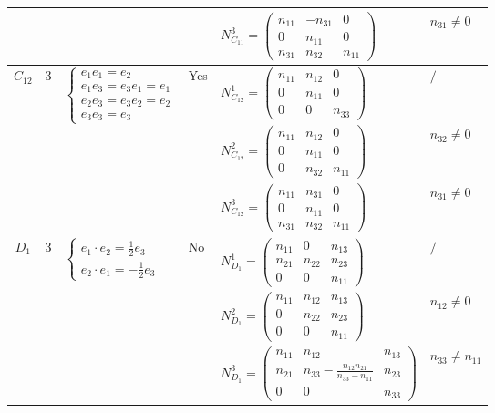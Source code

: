 \documentclass[12pt, reqno]{amsart}
\theoremstyle{plain}
\begin{document}
\begin{table}[H]
\begin{tabular}{|c|c|l|l|l|l|}
    & & & & $N_{C_{11}}^3 = \begin{pmatrix} n_{11} & -n_{31} & 0 \\ 0 & n_{11} & 0 \\ n_{31} & n_{32} & n_{11} \end{pmatrix}$ & $n_{31}\neq0$ \\
    \hline
    \multirow{3}{*}{$C_{12}$} & \multirow{3}{*}{3} & \multirow{3}{*}{$\begin{cases} e_1 e_1 = e_2 \\ e_1 e_3 = e_3 e_1 = e_1 \\ e_2 e_3 = e_3 e_2 = e_2 \\ e_3 e_3 = e_3 \end{cases}$} & \multirow{3}{*}{Yes} & 
    $N_{C_{12}}^1 = \begin{pmatrix} n_{11} & n_{12} & 0 \\ 0 & n_{11} & 0 \\ 0 & 0 & n_{33} \end{pmatrix}$ & $/$ \\
    & & & & $N_{C_{12}}^2 = \begin{pmatrix} n_{11} & n_{12} & 0 \\ 0 & n_{11} & 0 \\ 0 & n_{32} & n_{11} \end{pmatrix}$ & $n_{32}\neq0$ \\
    & & & & $N_{C_{12}}^3 = \begin{pmatrix} n_{11} & n_{31} & 0 \\ 0 & n_{11} & 0 \\ n_{31} & n_{32} & n_{11} \end{pmatrix}$ & $n_{31}\neq0$ \\
    \hline
    \multirow{3}{*}{$D_1$} & \multirow{3}{*}{3} & \multirow{3}{*}{$\begin{cases} e_1 \cdot e_2 = \frac{1}{2} e_3 \\ e_2 \cdot e_1 = -\frac{1}{2} e_3 \end{cases}$} & \multirow{3}{*}{No} & 
    $N_{D_1}^1 = \begin{pmatrix} n_{11} & 0 & n_{13} \\ n_{21} & n_{22} & n_{23} \\ 0 & 0 & n_{11} \end{pmatrix}$ & $/$ \\
    & & & & $N_{D_1}^2 = \begin{pmatrix} n_{11} & n_{12} & n_{13} \\ 0 & n_{22} & n_{23} \\ 0 & 0 & n_{11} \end{pmatrix}$ & $n_{12} \neq 0$ \\
    & & & & $N_{D_1}^3 = \begin{pmatrix} n_{11} & n_{12} & n_{13} \\ n_{21} & n_{33} - \frac{n_{12}n_{21}}{n_{33}-n_{11}} & n_{23} \\ 0 & 0 & n_{33} \end{pmatrix}$ & $n_{33} \neq n_{11}$ \\
    \hline
    \end{tabular}
    \label{tab:nijenhuis_3d_associative_C9-C12}
\end{table}
\end{document}
